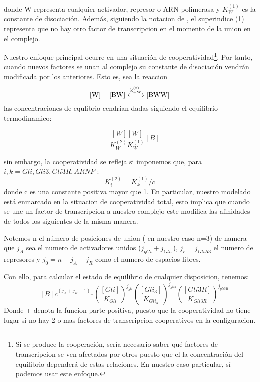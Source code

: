 donde W representa cualquier activador, represor o ARN polimerasa y $K^{(1)}_W$ es la constante de disociación. Además, siguiendo la notacion de \cite{cambon1}, el superindice (1) representa que no hay otro factor de transcripcion en el momento de la union en el complejo. 

Nuestro enfoque principal ocurre en una situación de cooperatividad\footnote{Si se produce la cooperación, sería necesario saber qué factores de transcripcion se ven afectados por otros puesto que el  la concentración del equilibrio dependerá de estas relaciones. En nuestro caso particular, sí podemos usar este enfoque.}. Por tanto, cuando nuevos factores se unan al complejo su constante de disociación vendrán modificada por los anteriores. Esto es, sea la reaccion
\begin{equation}
\ce{[W] + [BW] <->[k^{(2)}_{+W}] [BWW] }
\label{s:125}
\end{equation}
las concentraciones de equlibrio cendrían dadas siguiendo el equilibrio termodinamico:

\begin{equation}
[BWW]=\frac{[W][W]}{K_{W}^{(2)}K_{W}^{(1)}}[B]
\end{equation}


sin embargo, la cooperatividad se refleja si imponemos que, para $i,k= Gli,Gli3,Gli3R,ARNP$ :
$$K_i^{(2)}=K_k^{(1)}/c
$$
donde c es una constante positiva mayor que 1. En particular, nuestro modelado está enmarcado en la situacion de cooperatividad total, esto implica que cuando se une un factor de transcripcion a nuestro complejo este modifica las afinidades de todos los siguientes de la misma manera.


Notemos n el número de posiciones de union ( en nuestro caso n=3) de namera que $j_A$ sea el numero de activadores unidos ($j_{gGi}+j_{Gli_3}$), $j_r=j_{GliR3}$ el numero de represores y $j_0=n-j_A-j_R$ como el numero de espacios libres.  

Con ello, para calcular el estado de equilibrio de cualquier disposicion, tenemos:
\begin{equation}
[BGli^{j_{Gli}}Gli_3^{j_{Gli_3}}Gli3R^{j_{Gli3R}}]=[B]c^{(j_A+j_R-1)_+}\left(\frac{[Gli]}{K_{Gli}}\right)^{j_{gli}}
\left(\frac{[Gli_3]}{K_{Gli_3}}\right)^{j_{gli_3}}
\left(\frac{[Gli3R]}{K_{Gli3R}}\right)^{j_{gli3R}}
\label{eqa}
\end{equation}
Donde + denota la funcion parte positiva, puesto que la cooperatividad no tiene lugar si no hay 2 o mas factores de transcripcion cooperativos en la configuracion.

